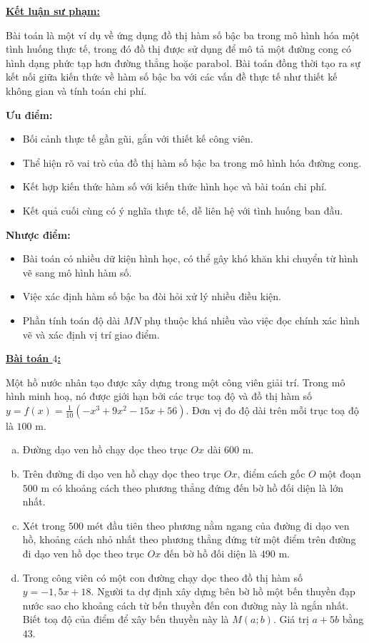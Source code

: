 \documentclass[12pt,a4paper,oneside]{book}
\theoremstyle{theorem}
\theoremstyle{definition}
\begin{document}
        \textbf{\underline{Kết luận sư phạm:}}

        Bài toán là một ví dụ về ứng dụng đồ thị hàm số bậc ba trong mô hình hóa một tình huống thực tế, trong đó đồ thị được sử dụng để mô tả một đường cong có hình dạng phức tạp hơn đường thẳng hoặc parabol. Bài toán đồng thời tạo ra sự kết nối giữa kiến thức về hàm số bậc ba với các vấn đề thực tế như thiết kế không gian và tính toán chi phí.       
        
        \textbf{Ưu điểm:}
        \begin{itemize}
            \item Bối cảnh thực tế gần gũi, gắn với thiết kế công viên.
            \item Thể hiện rõ vai trò của đồ thị hàm số bậc ba trong mô hình hóa đường cong.
            \item Kết hợp kiến thức hàm số với kiến thức hình học và bài toán chi phí.
            \item Kết quả cuối cùng có ý nghĩa thực tế, dễ liên hệ với tình huống ban đầu.
        \end{itemize}
        
        \textbf{Nhược điểm:}
        \begin{itemize}
            \item Bài toán có nhiều dữ kiện hình học, có thể gây khó khăn khi chuyển từ hình vẽ sang mô hình hàm số.
            \item Việc xác định hàm số bậc ba đòi hỏi xử lý nhiều điều kiện.
            \item Phần tính toán độ dài \(MN\) phụ thuộc khá nhiều vào việc đọc chính xác hình vẽ và xác định vị trí giao điểm.
        \end{itemize}
    
    \textbf{\underline{Bài toán $4$:}}

        Một hồ nước nhân tạo được xây dựng trong một công viên giải trí. Trong mô hình minh hoạ, nó được giới hạn bởi các trục toạ độ và đồ thị hàm số $y = f(x) = \frac{1}{10}(-x^3 + 9x^2 - 15x + 56)$. Đơn vị đo độ dài trên mỗi trục toạ độ là $100\text{ m}$.

\begin{enumerate}[a)]
    \item Đường dạo ven hồ chạy dọc theo trục $Ox$ dài $600\text{ m}$.
    \item Trên đường đi dạo ven hồ chạy dọc theo trục $Ox$, điểm cách gốc $O$ một đoạn $500\text{ m}$ có khoảng cách theo phương thẳng đứng đến bờ hồ đối diện là lớn nhất.
    \item Xét trong $500$ mét đầu tiên theo phương nằm ngang của đường đi dạo ven hồ, khoảng cách nhỏ nhất theo phương thẳng đứng từ một điểm trên đường đi dạo ven hồ dọc theo trục $Ox$ đến bờ hồ đối diện là $490\text{ m}$.
    \item Trong công viên có một con đường chạy dọc theo đồ thị hàm số $y = -1,5x + 18$. Người ta dự định xây dựng bên bờ hồ một bến thuyền đạp nước sao cho khoảng cách từ bến thuyền đến con đường này là ngắn nhất. Biết toạ độ của điểm để xây bến thuyền này là $M(a; b)$. Giá trị $a + 5b$ bằng $43$.
\end{enumerate}
\end{document}
